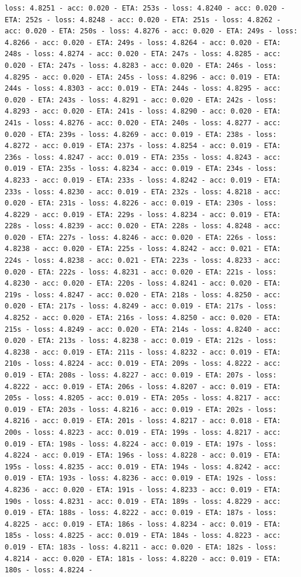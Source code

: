 \documentclass[11pt]{article}
\begin{document}
\begin{Verbatim}[commandchars=\\\{\}]
loss: 4.8251 - acc: 0.020 - ETA: 253s - loss: 4.8240 - acc: 0.020 - ETA: 252s - loss: 4.8248 - acc: 0.020 - ETA: 251s - loss: 4.8262 - acc: 0.020 - ETA: 250s - loss: 4.8276 - acc: 0.020 - ETA: 249s - loss: 4.8266 - acc: 0.020 - ETA: 249s - loss: 4.8264 - acc: 0.020 - ETA: 248s - loss: 4.8274 - acc: 0.020 - ETA: 247s - loss: 4.8285 - acc: 0.020 - ETA: 247s - loss: 4.8283 - acc: 0.020 - ETA: 246s - loss: 4.8295 - acc: 0.020 - ETA: 245s - loss: 4.8296 - acc: 0.019 - ETA: 244s - loss: 4.8303 - acc: 0.019 - ETA: 244s - loss: 4.8295 - acc: 0.020 - ETA: 243s - loss: 4.8291 - acc: 0.020 - ETA: 242s - loss: 4.8293 - acc: 0.020 - ETA: 241s - loss: 4.8290 - acc: 0.020 - ETA: 241s - loss: 4.8276 - acc: 0.020 - ETA: 240s - loss: 4.8277 - acc: 0.020 - ETA: 239s - loss: 4.8269 - acc: 0.019 - ETA: 238s - loss: 4.8272 - acc: 0.019 - ETA: 237s - loss: 4.8254 - acc: 0.019 - ETA: 236s - loss: 4.8247 - acc: 0.019 - ETA: 235s - loss: 4.8243 - acc: 0.019 - ETA: 235s - loss: 4.8234 - acc: 0.019 - ETA: 234s - loss: 4.8233 - acc: 0.019 - ETA: 233s - loss: 4.8242 - acc: 0.019 - ETA: 233s - loss: 4.8230 - acc: 0.019 - ETA: 232s - loss: 4.8218 - acc: 0.020 - ETA: 231s - loss: 4.8226 - acc: 0.019 - ETA: 230s - loss: 4.8229 - acc: 0.019 - ETA: 229s - loss: 4.8234 - acc: 0.019 - ETA: 228s - loss: 4.8239 - acc: 0.020 - ETA: 228s - loss: 4.8248 - acc: 0.020 - ETA: 227s - loss: 4.8246 - acc: 0.020 - ETA: 226s - loss: 4.8238 - acc: 0.020 - ETA: 225s - loss: 4.8242 - acc: 0.021 - ETA: 224s - loss: 4.8238 - acc: 0.021 - ETA: 223s - loss: 4.8233 - acc: 0.020 - ETA: 222s - loss: 4.8231 - acc: 0.020 - ETA: 221s - loss: 4.8230 - acc: 0.020 - ETA: 220s - loss: 4.8241 - acc: 0.020 - ETA: 219s - loss: 4.8247 - acc: 0.020 - ETA: 218s - loss: 4.8250 - acc: 0.020 - ETA: 217s - loss: 4.8249 - acc: 0.019 - ETA: 217s - loss: 4.8252 - acc: 0.020 - ETA: 216s - loss: 4.8250 - acc: 0.020 - ETA: 215s - loss: 4.8249 - acc: 0.020 - ETA: 214s - loss: 4.8240 - acc: 0.020 - ETA: 213s - loss: 4.8238 - acc: 0.019 - ETA: 212s - loss: 4.8238 - acc: 0.019 - ETA: 211s - loss: 4.8232 - acc: 0.019 - ETA: 210s - loss: 4.8224 - acc: 0.019 - ETA: 209s - loss: 4.8222 - acc: 0.019 - ETA: 208s - loss: 4.8227 - acc: 0.019 - ETA: 207s - loss: 4.8222 - acc: 0.019 - ETA: 206s - loss: 4.8207 - acc: 0.019 - ETA: 205s - loss: 4.8205 - acc: 0.019 - ETA: 205s - loss: 4.8217 - acc: 0.019 - ETA: 203s - loss: 4.8216 - acc: 0.019 - ETA: 202s - loss: 4.8216 - acc: 0.019 - ETA: 201s - loss: 4.8217 - acc: 0.018 - ETA: 200s - loss: 4.8223 - acc: 0.019 - ETA: 199s - loss: 4.8217 - acc: 0.019 - ETA: 198s - loss: 4.8224 - acc: 0.019 - ETA: 197s - loss: 4.8224 - acc: 0.019 - ETA: 196s - loss: 4.8228 - acc: 0.019 - ETA: 195s - loss: 4.8235 - acc: 0.019 - ETA: 194s - loss: 4.8242 - acc: 0.019 - ETA: 193s - loss: 4.8236 - acc: 0.019 - ETA: 192s - loss: 4.8236 - acc: 0.020 - ETA: 191s - loss: 4.8233 - acc: 0.019 - ETA: 190s - loss: 4.8231 - acc: 0.019 - ETA: 189s - loss: 4.8229 - acc: 0.019 - ETA: 188s - loss: 4.8222 - acc: 0.019 - ETA: 187s - loss: 4.8225 - acc: 0.019 - ETA: 186s - loss: 4.8234 - acc: 0.019 - ETA: 185s - loss: 4.8225 - acc: 0.019 - ETA: 184s - loss: 4.8223 - acc: 0.019 - ETA: 183s - loss: 4.8211 - acc: 0.020 - ETA: 182s - loss: 4.8214 - acc: 0.020 - ETA: 181s - loss: 4.8220 - acc: 0.019 - ETA: 180s - loss: 4.8224 - 
\end{Verbatim}
\end{document}
